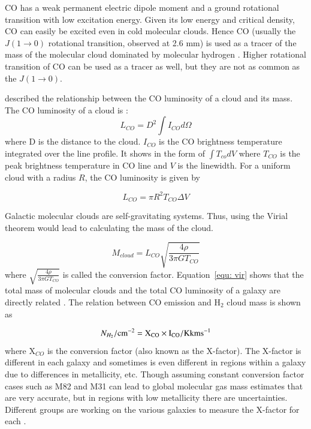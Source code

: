 CO has a weak permanent electric dipole moment and a ground rotational transition with low excitation energy. Given its low energy and critical density, CO can easily be excited even in cold molecular clouds. Hence CO (usually the $J(1\rightarrow 0)$ rotational transition, observed at 2.6 mm) is used as a tracer of the mass of the molecular cloud dominated by molecular hydrogen \citep[see, for example,][] {Sanders84}. Higher rotational transition of CO can be used as a tracer as well, but they are not as common as the $J(1\rightarrow 0)$.

\cite{Young91} described the relationship between the CO luminosity of a cloud and its mass. The CO luminosity of a cloud is :
\begin{equation}
L_{CO} = D^2 \int I_{CO} d\Omega 
\end{equation}
where D is the distance to the cloud. $I_{CO}$ is the CO brightness temperature integrated over the line profile. It shows in the form of ${\int T_{co} dV}$ where $T_{CO}$ is the peak brightness temperature in CO line and $V$ is the linewidth. For a uniform cloud with a radius $R$, the CO luminosity is given by

 \begin{equation}
L_{CO} = \pi R^2 T_{CO} \Delta V
\end{equation}

Galactic molecular clouds are self-gravitating systems. Thus, using the Virial theorem would lead to calculating the mass of the cloud.

 \begin{equation}
 \label{equ: vir}
 M_{cloud} = L_{CO} \sqrt{\frac{4\rho}{3\pi G T_{CO}}}
 \end{equation}
 where $\sqrt{\frac{4\rho}{3\pi G T_{CO}}}$ is called the conversion factor. Equation~\ref{equ: vir} shows that the total mass of molecular clouds and the total CO luminosity of a galaxy are directly related \citep{Young91}. The relation between CO emission and H$_2$ cloud mass is shown as

\begin{equation}
N_{H_2}/\rm cm^{-2} = X_{CO} \times I_{CO}/\rm K km s^{-1}
\end{equation}
where X$_{CO}$ is the conversion factor (also known as the X-factor). The X-factor is different in each galaxy and sometimes is even different in regions within a galaxy due to differences in metallicity, etc. Though assuming constant conversion factor cases such as M82 and M31 can lead to global molecular gas mass estimates that are very accurate,  but in regions with low metallicity there are uncertainties. Different groups are working on the various galaxies to measure the X-factor for each \citep{Wilson95, Bosselli02, Bolato13}.

